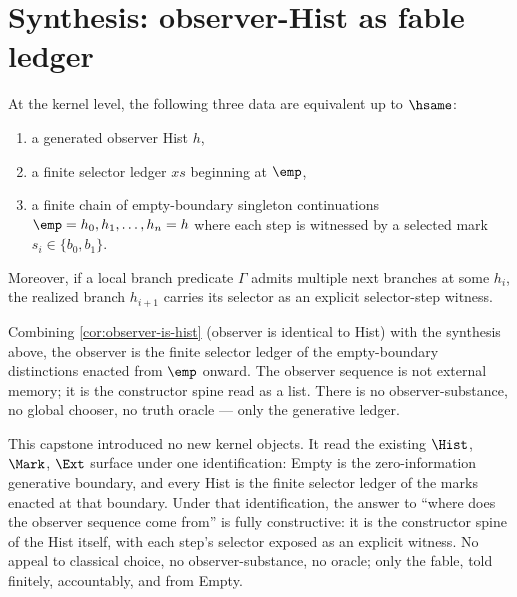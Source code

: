 \section{Synthesis: observer-Hist as fable ledger}
\label{sec:efm-synthesis}

\begin{theorem}
\label{thm:efm-synthesis}
At the kernel level, the following three data are equivalent up to $\hsame$:
\begin{enumerate}
  \item a generated observer Hist $h$,
  \item a finite selector ledger $xs$ beginning at $\emp$,
  \item a finite chain of empty-boundary singleton continuations $\emp = h_0, h_1, \dots, h_n = h$ where each step is witnessed by a selected mark $s_i \in \{b_0, b_1\}$.
\end{enumerate}
Moreover, if a local branch predicate $\Gamma$ admits multiple next branches at some $h_i$, the realized branch $h_{i+1}$ carries its selector as an explicit selector-step witness.
\end{theorem}

\begin{corollary}
\label{cor:efm-observer-as-ledger}
Combining \autoref{cor:observer-is-hist} (observer is identical to Hist) with the synthesis above, the observer is the finite selector ledger of the empty-boundary distinctions enacted from $\emp$ onward. The observer sequence is not external memory; it is the constructor spine read as a list. There is no observer-substance, no global chooser, no truth oracle --- only the generative ledger.
\end{corollary}

\begin{remark}
\label{rem:efm-closing}
This capstone introduced no new kernel objects. It read the existing $\Hist$, $\Mark$, $\Ext$ surface under one identification: Empty is the zero-information generative boundary, and every Hist is the finite selector ledger of the marks enacted at that boundary. Under that identification, the answer to ``where does the observer sequence come from'' is fully constructive: it is the constructor spine of the Hist itself, with each step's selector exposed as an explicit witness. No appeal to classical choice, no observer-substance, no oracle; only the fable, told finitely, accountably, and from Empty.
\end{remark}

